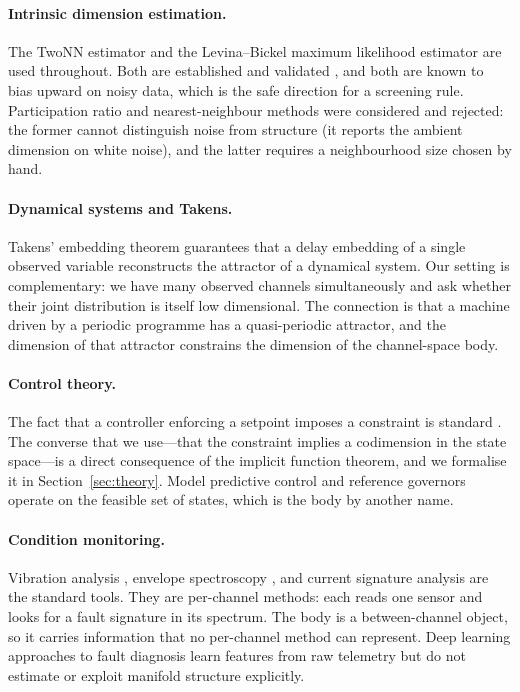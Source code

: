 \documentclass[11pt]{article}
\begin{document}
\paragraph{Intrinsic dimension estimation.} The TwoNN estimator
\cite{facco2017} and the Levina--Bickel maximum likelihood estimator
\cite{levina2004} are used throughout. Both are established and validated
\cite{camastra2002,grassberger2004}, and both are known to bias upward on
noisy data, which is the safe direction for a screening rule. Participation
ratio \cite{camastra2002} and nearest-neighbour methods
\cite{petrantonakis2010} were considered and rejected: the former cannot
distinguish noise from structure (it reports the ambient dimension on white
noise), and the latter requires a neighbourhood size chosen by hand.

\paragraph{Dynamical systems and Takens.} Takens' embedding theorem
\cite{takens1981,sauer1991} guarantees that a delay embedding of a single
observed variable reconstructs the attractor of a dynamical system. Our setting
is complementary: we have many observed channels simultaneously and ask whether
their joint distribution is itself low dimensional. The connection is that a
machine driven by a periodic programme has a quasi-periodic attractor, and the
dimension of that attractor constrains the dimension of the channel-space body.

\paragraph{Control theory.} The fact that a controller enforcing a setpoint
imposes a constraint is standard \cite{astrom2008,khalil2002}. The converse
that we use---that the constraint implies a codimension in the state space---is
a direct consequence of the implicit function theorem, and we formalise it in
Section~\ref{sec:theory}. Model predictive control \cite{garcia1989} and
reference governors \cite{gilbert1991} operate on the feasible set of states,
which is the body by another name.

\paragraph{Condition monitoring.} Vibration analysis \cite{randall2011},
envelope spectroscopy \cite{mcfadden1984}, and current signature analysis
\cite{nandi2015} are the standard tools. They are per-channel methods: each
reads one sensor and looks for a fault signature in its spectrum. The body is
a between-channel object, so it carries information that no per-channel method
can represent. Deep learning approaches to fault diagnosis
\cite{zhao2019,zhang2020,wang2021} learn features from raw telemetry but do
not estimate or exploit manifold structure explicitly.
\end{document}
